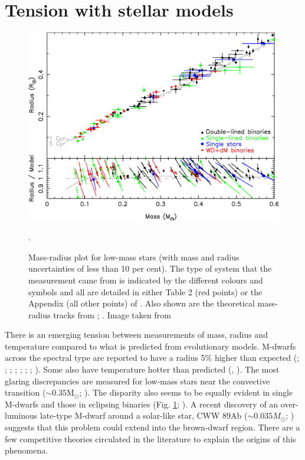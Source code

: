 \section{Tension with stellar models}\label{introduction:tension}


\begin{figure}
    \centering
    \includegraphics[width=\textwidth]{3-images/MDMR.eps}
    \caption{Mass-radius plot for low-mass stars (with mass and radius uncertainties of less than 10 per cent). The type of system that the measurement came from is indicated by the different colours and symbols and all are detailed in either Table 2 (red points) or the Appendix (all other points) of \protect\citet{2018MNRAS.481.1083P}. Also shown are the theoretical mass-radius tracks from \protect\citet{2003IAUS..211...41B}; \protect\citet{2015A&A...577A..42B}. Image taken from \protect\citet{2018MNRAS.481.1083P}}.
    \label{introduction:fig:parsons}
\end{figure}


There is an emerging tension between measurements of mass, radius and temperature compared to what is predicted from evolutionary models. M-dwarfs across the spectral type are reported to have a radius 5\% higher than expected (\citealt{2000ApJ...542..464C}; \citealt{2002ApJ...567.1140T}; \citealt{2003A&A...398..239R}; \citealt{2005ApJ...631.1120L}; \citealt{2008MmSAI..79..562R}; \citealt{2014ApJ...797...31T}; \citealt{2015A&A...577A..42B}; \citealt{2017ApJ...844..134L}). Some also have temperature hotter than predicted (\citealt{2012MNRAS.423L...1O}, \citealt{2014A&A...572A..50G}). The most glaring discrepancies are measured for low-mass stars near the convective transition ($\sim 0.35$M$_\odot$; \citealt{2007ApJ...660..732L}). The disparity also seems to be equally evident in single M-dwarfs and those in eclipsing binaries (Fig. \ref{introduction:fig:parsons}; \citealt{2013ApJ...776...87S}). A recent discovery of an over-luminous late-type M-dwarf around a solar-like star, CWW 89Ab ($\sim 0.035 M_\odot$; \citealt{2018AJ....156..168B}) suggests that this problem could extend into the brown-dwarf region. There are a few competitive theories circulated in the literature to explain the origins of this phenomena.

